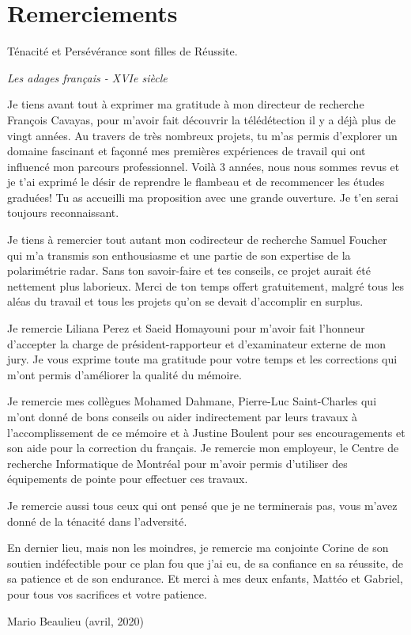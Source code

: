\chapter*{Remerciements}

\epigraph{\scriptsize Ténacité et Persévérance sont filles de Réussite.}{\textit{\tiny Les adages français - XVIe siècle}}

\vspace{8mm}
\footnotesize{
Je tiens avant tout à exprimer ma gratitude à mon directeur de recherche François Cavayas, pour m’avoir fait découvrir la télédétection il y a déjà plus de vingt années. Au travers de très nombreux projets, tu m’as permis d’explorer un domaine fascinant et façonné mes premières expériences de travail qui ont influencé mon parcours professionnel. Voilà 3 années, nous nous sommes revus et je t’ai exprimé le désir de reprendre le flambeau et de recommencer les études graduées! Tu as accueilli ma proposition avec une grande ouverture. Je t’en serai toujours reconnaissant.

Je tiens à remercier tout autant mon codirecteur de recherche Samuel Foucher qui m’a transmis son enthousiasme et une partie de son expertise de la polarimétrie radar. Sans ton savoir-faire et tes conseils, ce projet aurait été nettement plus laborieux. Merci de ton temps offert gratuitement, malgré tous les aléas du travail et tous les projets qu’on se devait d’accomplir en surplus.

Je remercie Liliana Perez et Saeid Homayouni pour m’avoir fait l’honneur d’accepter la charge de président-rapporteur et d'examinateur externe de mon jury. Je vous exprime toute ma gratitude pour votre temps et les corrections qui m’ont permis d’améliorer la qualité du mémoire.

Je remercie mes collègues Mohamed Dahmane, Pierre-Luc Saint-Charles qui m’ont donné de bons conseils ou aider indirectement par leurs travaux à l’accomplissement de ce mémoire et à Justine Boulent pour ses encouragements et son aide pour la correction du français. Je remercie mon employeur, le Centre de recherche Informatique de Montréal pour m’avoir permis d’utiliser des équipements de pointe pour effectuer ces travaux.

Je remercie aussi tous ceux qui ont pensé que je ne terminerais pas, vous m’avez donné de la ténacité dans l’adversité.

En dernier lieu, mais non les moindres, je remercie ma conjointe Corine de son soutien indéfectible pour ce plan fou que j’ai eu, de sa confiance en sa réussite, de sa patience et de son endurance.  Et merci à mes deux enfants, Mattéo et Gabriel, pour tous vos sacrifices et votre patience.

\begin{flushright}
Mario Beaulieu 
(avril, 2020)
\end{flushright}
}

\normalsize
